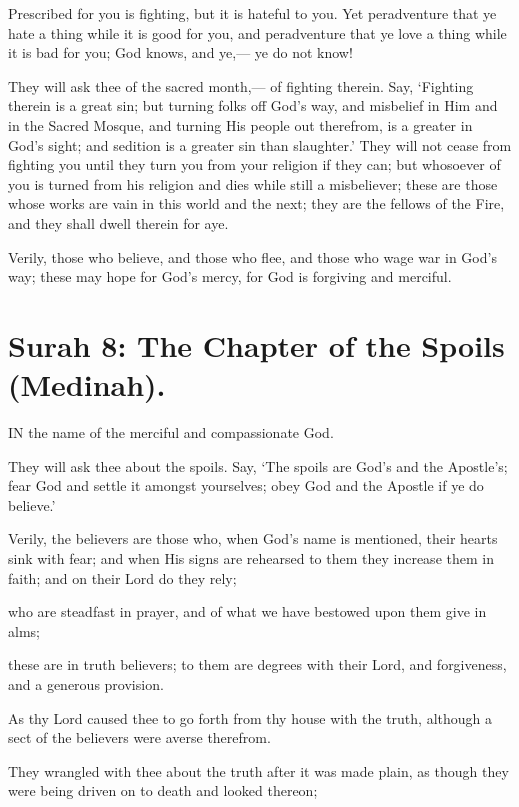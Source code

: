 \documentclass[fontsize=14pt, letterpaper, notitlepage, openany, DIV=12]{scrbook} %
\begin{document}
\noindent[2:216]
Prescribed for you is fighting, but it is hateful to you. Yet peradventure that ye hate a
thing while it is good for you, and peradventure that ye love a thing while it is bad for you; God
knows, and ye,--- ye do not know!

\noindent[2:217]
They will ask thee of the sacred month,--- of fighting therein. Say, `Fighting therein is a
great sin; but turning folks off God's way, and misbelief in Him and in the Sacred Mosque, and
turning His people out therefrom, is a greater in God's sight; and sedition is a greater sin than
slaughter.' They will not cease from fighting you until they turn you from your religion if they
can; but whosoever of you is turned from his religion and dies while still a misbeliever; these are
those whose works are vain in this world and the next; they are the fellows of the Fire, and they
shall dwell therein for aye.

\noindent[2:218]
Verily, those who believe, and those who flee, and those who wage war in God's way;
these may hope for God's mercy, for God is forgiving and merciful.


\section{Surah 8: The Chapter of the Spoils (Medinah).}


IN the name of the merciful and compassionate God.

\noindent[8:1]
They will ask thee about the spoils. Say, `The spoils are God's and the Apostle's; fear
God and settle it amongst yourselves; obey God and the Apostle if ye do believe.'

\noindent[8:2]
Verily, the believers are those who, when God's name is mentioned, their hearts sink
with fear; and when His signs are rehearsed to them they increase them in faith; and on their
Lord do they rely;

\noindent[8:3]
who are steadfast in prayer, and of what we have bestowed upon them give in alms;

\noindent[8:4]
these are in truth believers; to them are degrees with their Lord, and forgiveness, and a
generous provision.

\noindent[8:5]
As thy Lord caused thee to go forth from thy house with the truth, although a sect of the
believers were averse therefrom.

\noindent[8:6]
They wrangled with thee about the truth after it was made plain, as though they were
being driven on to death and looked thereon;
\end{document}
